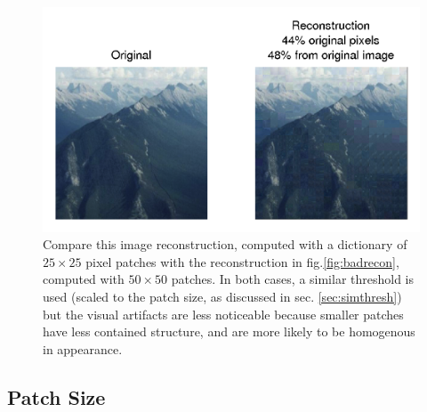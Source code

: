  \begin{figure}
\centering
\includegraphics[width=0.9\linewidth]{Figures/184_25.png}
\caption{Compare this image reconstruction, computed with a dictionary of $25\times 25$ pixel patches with the reconstruction in fig.\ref{fig:badrecon}, computed with $50\times 50$ patches. In both cases, a similar threshold is used (scaled to the patch size, as discussed in sec. \ref{sec:simthresh}) but the visual artifacts are less noticeable because smaller patches have less contained structure, and are more likely to be homogenous in appearance.}
\label{fig:patchsize}
\end{figure}




\subsection{Patch Size}
\label{sec:patchsize}

